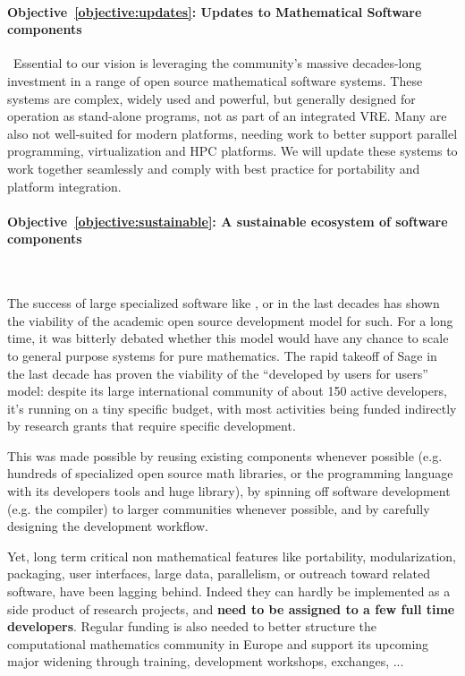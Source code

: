 \documentclass[noworkareas,deliverables,keys]{euproposal}                  %
\begin{document}
\begin{proposal}
\paragraph{Objective~\ref{objective:updates}: Updates to Mathematical
  Software components}\ 
Essential to our vision is leveraging the community's massive
decades-long investment in a range of open source mathematical
software systems. These systems are complex, widely used and powerful,
but generally designed for operation as stand-alone programs, not as
part of an integrated VRE. Many are also not well-suited for modern
platforms, needing work to better support parallel programming,
virtualization and HPC platforms. We will update these systems to work
together seamlessly and comply with best practice for portability and
platform integration.


\paragraph{Objective~\ref{objective:sustainable}: A sustainable
  ecosystem of software components}\ 

The success of large specialized software like \PariGP, \Singular or
\GAP in the last decades has shown the viability of the academic open
source development model for such. For a long time, it was bitterly
debated whether this model would have any chance to scale to general
purpose systems for pure mathematics. The rapid takeoff of Sage in the
last decade has proven the viability of the ``developed by users for
users'' model: despite its large international community of about 150
active developers, it's running on a tiny specific budget, with most
activities being funded indirectly by research grants that require
specific development.

This was made possible by reusing existing components whenever
possible (e.g. hundreds of specialized open source math libraries, or
the \Python programming language with its developers tools and huge
library), by spinning off software development (e.g. the \Cython
compiler) to larger communities whenever possible, and by carefully
designing the development workflow.

Yet, long term critical non mathematical features like portability,
modularization, packaging, user interfaces, large data, parallelism,
or outreach toward related software, have been lagging behind. Indeed
they can hardly be implemented as a side product of research projects,
and \textbf{need to be assigned to a few full time developers}. Regular
funding is also needed to better structure the computational
mathematics community in Europe and support its upcoming major
widening through training, development workshops, exchanges, ...


\end{proposal}
\end{document}
